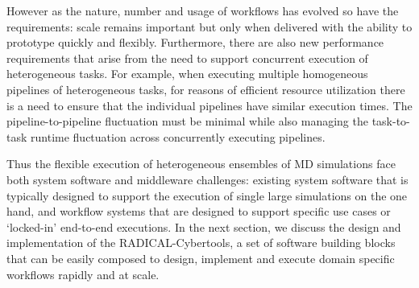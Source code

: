 However as the nature, number and usage of workflows has evolved so have the
requirements: scale remains important but only when delivered with the
ability to prototype quickly and flexibly. Furthermore, there are also new
performance requirements that arise from the need to support concurrent
execution of heterogeneous tasks. For example, when executing multiple
homogeneous pipelines of heterogeneous tasks, for reasons of efficient
resource utilization there is a need to ensure that the individual pipelines
have similar execution times. The pipeline-to-pipeline fluctuation must be
minimal while also managing the task-to-task runtime fluctuation across
concurrently executing pipelines.

Thus the flexible execution of heterogeneous ensembles of MD simulations face both system software and
middleware challenges: existing system software that is typically designed to
support the execution of single large simulations on the one hand, and
workflow systems that are designed to support specific use cases or `locked-in' end-to-end executions. %
In the next section, we discuss the design and implementation of the
RADICAL-Cybertools, a set of software building blocks that can be easily
composed to design, implement and execute domain specific workflows rapidly
and at scale.


